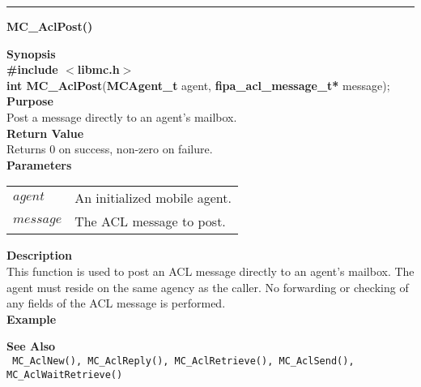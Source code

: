 \noindent
\vspace{5pt}
\rule{6.5in}{0.015in}
\noindent
{}
{\LARGE \bf MC\_AclPost()}\\
\label{api:MC_AclPost()}

\noindent
{\bf Synopsis}\\
{\bf \#include $<$libmc.h$>$}\\
{\bf int MC\_AclPost}({\bf MCAgent\_t} agent, {\bf fipa\_acl\_message\_t*} message);\\

\noindent
{\bf Purpose}\\
Post a message directly to an agent's mailbox.\\

\noindent
{\bf Return Value}\\
Returns 0 on success, non-zero on failure.\\

\noindent
{\bf Parameters}
\vspace{-0.1in}
\begin{description}
\item
\begin{tabular}{p{10 mm}p{145 mm}} 
$agent$ & An initialized mobile agent. \\
$message$ & The ACL message to post. 
\end{tabular}
\end{description}

\noindent
{\bf Description}\\
This function is used to post an ACL message directly to an agent's 
mailbox. The agent must reside on the same agency as the caller.
No forwarding or checking of any fields of the ACL message is performed.\\

\noindent
{\bf Example}\\
\noindent

\noindent
{\bf See Also}\\
\texttt{
  MC\_AclNew(), MC\_AclReply(), MC\_AclRetrieve(), MC\_AclSend(), \linebreak 
    MC\_AclWaitRetrieve()
}

